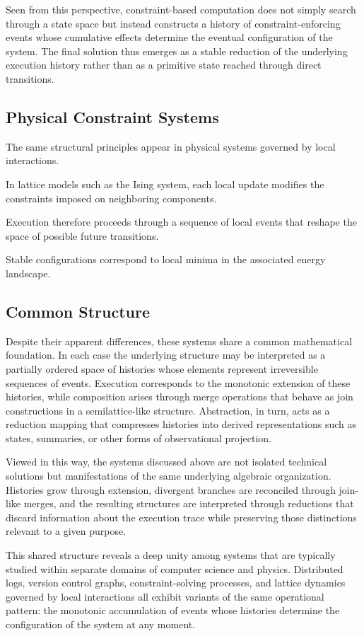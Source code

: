 \documentclass[12pt]{article}
\begin{document}
Seen from this perspective, constraint-based computation
does not simply search through a state space but instead
constructs a history of constraint-enforcing events whose
cumulative effects determine the eventual configuration
of the system. The final solution thus emerges as a stable
reduction of the underlying execution history rather than
as a primitive state reached through direct transitions.

\subsection{Physical Constraint Systems}

The same structural principles appear in physical
systems governed by local interactions.

In lattice models such as the Ising system,
each local update modifies the constraints
imposed on neighboring components.

Execution therefore proceeds through a sequence
of local events that reshape the space of
possible future transitions.

Stable configurations correspond to local minima
in the associated energy landscape.
\subsection{Common Structure}

Despite their apparent differences, these systems share
a common mathematical foundation. In each case the
underlying structure may be interpreted as a partially
ordered space of histories whose elements represent
irreversible sequences of events. Execution corresponds
to the monotonic extension of these histories, while
composition arises through merge operations that behave
as join constructions in a semilattice-like structure.
Abstraction, in turn, acts as a reduction mapping that
compresses histories into derived representations such
as states, summaries, or other forms of observational
projection.

Viewed in this way, the systems discussed above are not
isolated technical solutions but manifestations of the
same underlying algebraic organization. Histories grow
through extension, divergent branches are reconciled
through join-like merges, and the resulting structures
are interpreted through reductions that discard
information about the execution trace while preserving
those distinctions relevant to a given purpose.

This shared structure reveals a deep unity among systems
that are typically studied within separate domains of
computer science and physics. Distributed logs, version
control graphs, constraint-solving processes, and lattice
dynamics governed by local interactions all exhibit
variants of the same operational pattern: the monotonic
accumulation of events whose histories determine the
configuration of the system at any moment.
\end{document}
